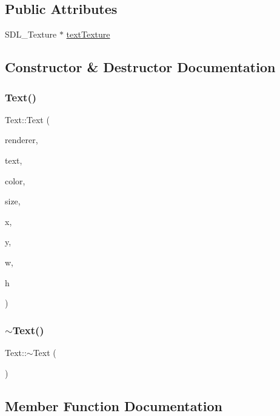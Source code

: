 \subsection*{Public Attributes}
\begin{DoxyCompactItemize}
\item 
S\+D\+L\+\_\+\+Texture $\ast$ \mbox{\hyperlink{class_text_a0db81807f575e9f4ff86bdae450ee246}{text\+Texture}}
\end{DoxyCompactItemize}


\subsection{Constructor \& Destructor Documentation}
\mbox{\label{class_text_a1a244ff955d98640e0046acef0659413}} 
\subsubsection{\texorpdfstring{Text()}{Text()}}
{\footnotesize\ttfamily Text\+::\+Text (\begin{DoxyParamCaption}\item[{S\+D\+L\+\_\+\+Renderer $\ast$}]{renderer,  }\item[{std\+::string}]{text,  }\item[{S\+D\+L\+\_\+\+Color}]{color,  }\item[{int}]{size,  }\item[{int}]{x,  }\item[{int}]{y,  }\item[{int}]{w,  }\item[{int}]{h }\end{DoxyParamCaption})}

\mbox{\label{class_text_a2d49e5c280e205125b149f7777ae30c7}} 
\subsubsection{\texorpdfstring{$\sim$\+Text()}{~Text()}}
{\footnotesize\ttfamily Text\+::$\sim$\+Text (\begin{DoxyParamCaption}{ }\end{DoxyParamCaption})}



\subsection{Member Function Documentation}
\mbox{\label{class_text_af4bb084ff0f66ad827ef6b006f9b0ebd}} 
